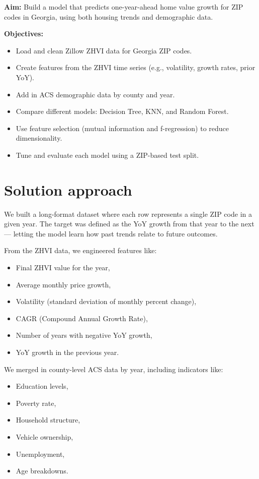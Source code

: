 \textbf{Aim:}  
Build a model that predicts one-year-ahead home value growth for ZIP codes in Georgia, using both housing trends and demographic data.

\textbf{Objectives:}
\begin{itemize}
    \item Load and clean Zillow ZHVI data for Georgia ZIP codes.
    \item Create features from the ZHVI time series (e.g., volatility, growth rates, prior YoY).
    \item Add in ACS demographic data by county and year.
    \item Compare different models: Decision Tree, KNN, and Random Forest.
    \item Use feature selection (mutual information and f-regression) to reduce dimensionality.
    \item Tune and evaluate each model using a ZIP-based test split.
\end{itemize}

\section{Solution approach}
\label{sec:intro_sol}

We built a long-format dataset where each row represents a single ZIP code in a given year. The target was defined as the YoY growth from that year to the next — letting the model learn how past trends relate to future outcomes.

From the ZHVI data, we engineered features like:
\begin{itemize}
    \item Final ZHVI value for the year,
    \item Average monthly price growth,
    \item Volatility (standard deviation of monthly percent change),
    \item CAGR (Compound Annual Growth Rate),
    \item Number of years with negative YoY growth,
    \item YoY growth in the previous year.
\end{itemize}

We merged in county-level ACS data by year, including indicators like:
\begin{itemize}
    \item Education levels,
    \item Poverty rate,
    \item Household structure,
    \item Vehicle ownership,
    \item Unemployment,
    \item Age breakdowns.
\end{itemize}

